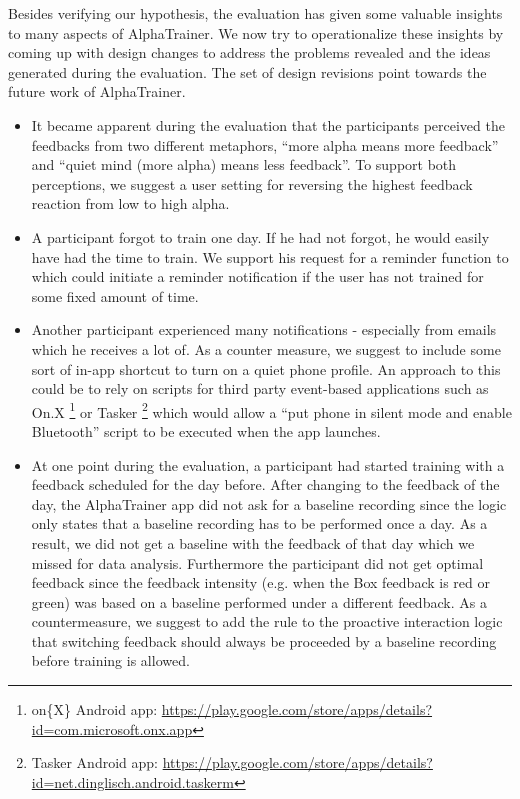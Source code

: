 \documentclass[a4paper,10pt,english,lof,lot,twoside]{puthesis}
\begin{document}
Besides verifying our hypothesis, the evaluation has given some valuable insights to many aspects of AlphaTrainer. We now try to operationalize these insights by coming up with design changes to address the problems revealed and the ideas generated during the evaluation. The set of design revisions point towards the future work of AlphaTrainer.
\begin{itemize}
\item {} 
It became apparent during the evaluation that the participants perceived the feedbacks from two different metaphors, ``more alpha means more feedback'' and ``quiet mind (more alpha) means less feedback''. To support both perceptions, we suggest a user setting for reversing the highest feedback reaction from low to high alpha.

\item {} 
A participant forgot to train one day. If he had not forgot, he would easily have had the time to train. We support his request for a reminder function to which could initiate a reminder notification if the user has not trained for some fixed amount of time.

\item {} 
Another participant experienced many notifications - especially from emails which he receives a lot of. As a counter measure, we suggest to include some sort of in-app shortcut to turn on a quiet phone profile. An approach to this could be to rely on scripts for third party event-based applications such as On.X \footnote{
on\{X\} Android app: \href{https://play.google.com/store/apps/details?id=com.microsoft.onx.app}{https://play.google.com/store/apps/details?id=com.microsoft.onx.app}
} or Tasker \footnote{
Tasker Android app: \href{https://play.google.com/store/apps/details?id=net.dinglisch.android.taskerm}{https://play.google.com/store/apps/details?id=net.dinglisch.android.taskerm}
} which would allow a ``put phone in silent mode and enable Bluetooth'' script to be executed when the app launches.

\item {} 
At one point during the evaluation, a participant had started training with a feedback scheduled for the day before. After changing to the feedback of the day, the AlphaTrainer app did not ask for a baseline recording since the logic only states that a baseline recording has to be performed once a day. As a result, we did not get a baseline with the feedback of that day which we missed for data analysis. Furthermore the participant did not get optimal feedback since the feedback intensity (e.g. when the Box feedback is red or green) was based on a baseline performed under a different feedback. As a countermeasure, we suggest to add the rule to the proactive interaction logic that switching feedback should always be proceeded by a baseline recording before training is allowed.


\end{itemize}
\end{document}
